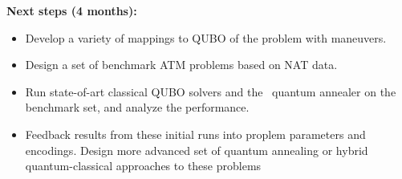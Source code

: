 \begin{center}
\colorbox{yellow!10}{
  \begin{minipage}[t]{0.9\columnwidth}
    \textbf{Next steps (4 months):}
      \begin{itemize}[leftmargin=0.5cm] 
        \itemsep-0.5em
        \item Develop a variety of mappings to QUBO of the problem with maneuvers.
        \item Design a set of benchmark ATM problems based on NAT data.
        \item Run state-of-art classical QUBO solvers and
the \DW\ quantum annealer on the benchmark set, and analyze the performance.
	\item Feedback results from these initial runs into proplem parameters and encodings. Design more advanced set of quantum annealing or hybrid 
quantum-classical approaches to these problems
      \end{itemize}
 \end{minipage}
}
\end{center}
